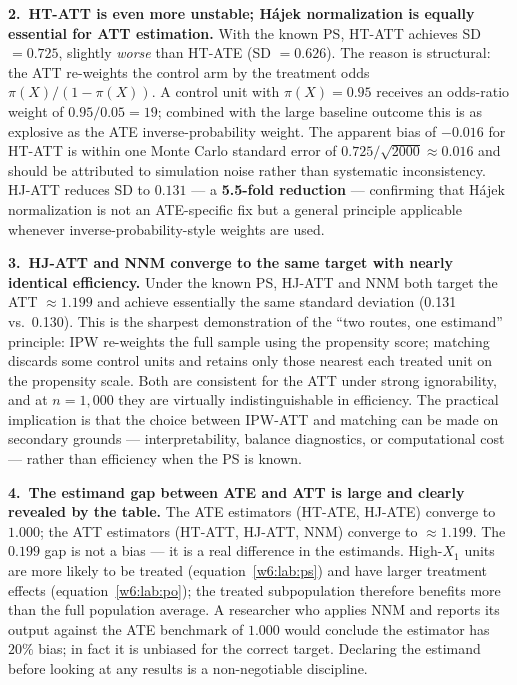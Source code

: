 \documentclass[master.tex]{subfiles}
\begin{document}
\medskip
\noindent\textbf{2.\ HT-ATT is even more unstable; Hájek normalization
is equally essential for ATT estimation.}
With the known PS, HT-ATT achieves SD $= 0.725$, slightly \emph{worse}
than HT-ATE (SD $= 0.626$).  The reason is structural: the ATT
re-weights the control arm by the treatment odds $\pi(X)/(1-\pi(X))$.
A control unit with $\pi(X) = 0.95$ receives an odds-ratio weight of
$0.95/0.05 = 19$; combined with the large baseline outcome this is as
explosive as the ATE inverse-probability weight.  The apparent bias of
$-0.016$ for HT-ATT is within one Monte Carlo standard error of
$0.725/\sqrt{2000} \approx 0.016$ and should be attributed to
simulation noise rather than systematic inconsistency.  HJ-ATT reduces
SD to $0.131$ --- a \textbf{5.5-fold reduction} --- confirming that
Hájek normalization is not an ATE-specific fix but a general principle
applicable whenever inverse-probability-style weights are used.

\medskip
\noindent\textbf{3.\ HJ-ATT and NNM converge to the same target with
nearly identical efficiency.}
Under the known PS, HJ-ATT and NNM both target the ATT $\approx 1.199$
and achieve essentially the same standard deviation (0.131 vs.\ 0.130).
This is the sharpest demonstration of the ``two routes, one estimand''
principle: IPW re-weights the full sample using the propensity score;
matching discards some control units and retains only those nearest
each treated unit on the propensity scale.  Both are consistent for
the ATT under strong ignorability, and at $n = 1{,}000$ they are
virtually indistinguishable in efficiency.  The practical implication
is that the choice between IPW-ATT and matching can be made on
secondary grounds --- interpretability, balance diagnostics, or
computational cost --- rather than efficiency when the PS is known.

\medskip
\noindent\textbf{4.\ The estimand gap between ATE and ATT is large and
clearly revealed by the table.}
The ATE estimators (HT-ATE, HJ-ATE) converge to $1.000$; the ATT
estimators (HT-ATT, HJ-ATT, NNM) converge to $\approx 1.199$.  The
$0.199$ gap is not a bias --- it is a real difference in the
estimands.  High-$X_1$ units are more likely to be treated
(equation~\eqref{w6:lab:ps}) and have larger treatment effects
(equation~\eqref{w6:lab:po}); the treated subpopulation therefore
benefits more than the full population average.  A researcher who
applies NNM and reports its output against the ATE benchmark of $1.000$
would conclude the estimator has $20\%$ bias; in fact it is unbiased
for the correct target.  Declaring the estimand before looking at any
results is a non-negotiable discipline.
\end{document}

